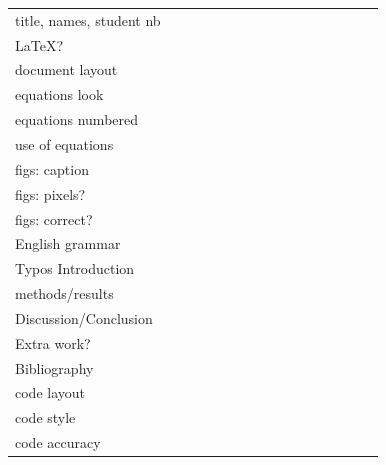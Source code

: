 \begin{tabular}{|p{5cm}|p{.35cm}|p{.35cm}|p{.35cm}|p{.35cm}|p{.35cm}|p{.35cm}|p{.35cm}|p{.35cm}|p{.35cm}|p{.35cm}|p{.35cm}|p{.35cm}|p{.35cm}|p{.35cm}|p{.35cm}|}
&&&&&&&&&&&&&&& \\
\hline
title, names, student nb &&&&&&&&&&&&&&& \\\hline
\LaTeX ? &&&&&&&&&&&&&&& \\\hline
document layout &&&&&&&&&&&&&&& \\\hline
equations look &&&&&&&&&&&&&&& \\\hline
equations numbered  &&&&&&&&&&&&&&& \\\hline
use of equations &&&&&&&&&&&&&&& \\\hline
figs: caption &&&&&&&&&&&&&&& \\\hline
figs: pixels? &&&&&&&&&&&&&&& \\\hline
figs: correct? &&&&&&&&&&&&&&& \\\hline
English grammar &&&&&&&&&&&&&&& \\\hline
Typos 
Introduction &&&&&&&&&&&&&&& \\\hline
methods/results &&&&&&&&&&&&&&& \\\hline
Discussion/Conclusion  &&&&&&&&&&&&&&& \\\hline
Extra work? &&&&&&&&&&&&&&& \\\hline
Bibliography &&&&&&&&&&&&&&& \\\hline
code layout &&&&&&&&&&&&&&& \\\hline 
code style &&&&&&&&&&&&&&& \\\hline
code accuracy &&&&&&&&&&&&&&& \\\hline
\end{tabular}





